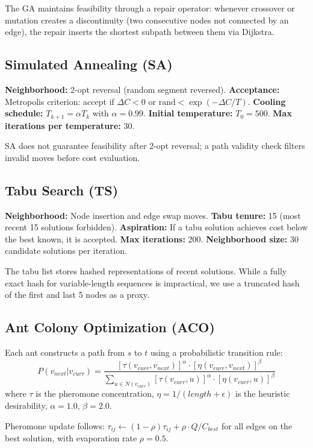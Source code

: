 \documentclass[journal]{IEEEtran}
\begin{document}
The GA maintains feasibility through a repair operator: whenever crossover or mutation creates a discontinuity (two consecutive nodes not connected by an edge), the repair inserts the shortest subpath between them via Dijkstra.

\subsection{Simulated Annealing (SA)}
\textbf{Neighborhood:} 2-opt reversal (random segment reversed). \textbf{Acceptance:} Metropolis criterion: accept if $\Delta C < 0$ or $\text{rand} < \exp(-\Delta C / T)$. \textbf{Cooling schedule:} $T_{k+1} = \alpha T_k$ with $\alpha=0.99$. \textbf{Initial temperature:} $T_0=500$. \textbf{Max iterations per temperature:} 30.

SA does not guarantee feasibility after 2-opt reversal; a path validity check filters invalid moves before cost evaluation.

\subsection{Tabu Search (TS)}
\textbf{Neighborhood:} Node insertion and edge swap moves. \textbf{Tabu tenure:} 15 (most recent 15 solutions forbidden). \textbf{Aspiration:} If a tabu solution achieves cost below the best known, it is accepted. \textbf{Max iterations:} 200. \textbf{Neighborhood size:} 30 candidate solutions per iteration.

The tabu list stores hashed representations of recent solutions. While a fully exact hash for variable-length sequences is impractical, we use a truncated hash of the first and last 5 nodes as a proxy.

\subsection{Ant Colony Optimization (ACO)}
Each ant constructs a path from $s$ to $t$ using a probabilistic transition rule:
\begin{equation}
\label{eq:aco_prob}
P(v_{next} | v_{curr}) = \frac{[\tau(v_{curr}, v_{next})]^\alpha \cdot [\eta(v_{curr}, v_{next})]^\beta}{\sum_{u \in N(v_{curr})} [\tau(v_{curr}, u)]^\alpha \cdot [\eta(v_{curr}, u)]^\beta}
\end{equation}
where $\tau$ is the pheromone concentration, $\eta = 1/(length + \epsilon)$ is the heuristic desirability, $\alpha=1.0$, $\beta=2.0$.

Pheromone update follows: $\tau_{ij} \leftarrow (1-\rho)\tau_{ij} + \rho \cdot Q/C_{best}$ for all edges on the best solution, with evaporation rate $\rho=0.5$.
\end{document}
